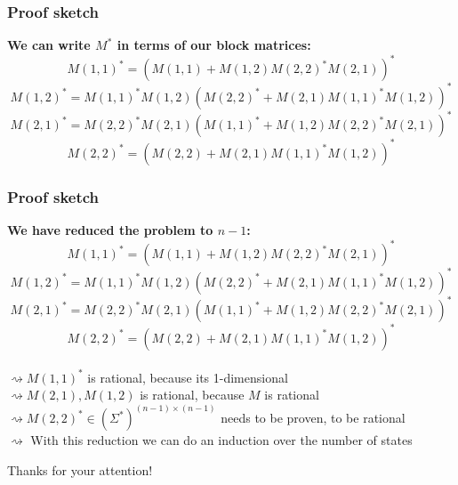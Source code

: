 \documentclass{beamer}
\begin{document}
\begin{frame}
  \frametitle{Proof sketch}
  {\bf We can write $M^*$ in terms of our block matrices:}
  \[ M(1,1)^* = (M(1,1)+M(1,2)M(2,2)^*M(2,1))^*\]
  \[ M(1,2)^* = M(1,1)^*M(1,2)(M(2,2)^* + M(2,1)M(1,1)^*M(1,2))^*\]
  \[ M(2,1)^* = M(2,2)^*M(2,1)(M(1,1)^* + M(1,2)M(2,2)^*M(2,1))^*\]
  \[ M(2,2)^* = (M(2,2)+M(2,1)M(1,1)^*M(1,2))^*\]
  \vspace{0.5cm}
  \begin{center}
  \end{center}
\end{frame}
\begin{frame}
  \frametitle{Proof sketch}
  {\bf We have reduced the problem to $n-1$:}
  \[ M(1,1)^* = (M(1,1)+M(1,2)M(2,2)^*M(2,1))^*\]
  \[ M(1,2)^* = M(1,1)^*M(1,2)(M(2,2)^* + M(2,1)M(1,1)^*M(1,2))^*\]
  \[ M(2,1)^* = M(2,2)^*M(2,1)(M(1,1)^* + M(1,2)M(2,2)^*M(2,1))^*\]
  \[ M(2,2)^* = (M(2,2)+M(2,1)M(1,1)^*M(1,2))^*\]\\
  \vspace{0.5cm}
  $\rightsquigarrow M(1,1)^*$ is rational, because its 1-dimensional\\
  $\rightsquigarrow M(2,1), M(1,2)$ is rational, because $M$ is rational\\
  $\rightsquigarrow M(2,2)^* \in (\Sigma^*)^{(n-1) \times (n-1)}$ 
    needs to be proven, to be rational \\
  $\rightsquigarrow $ With this reduction we can do an induction over the number of states
\end{frame}



\begin{frame}
    \Huge{\centerline{Thanks for your attention!}}
    
\end{frame}





\end{document}
